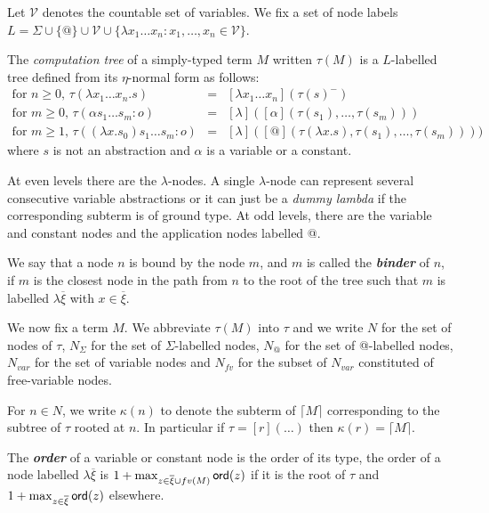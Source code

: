 \documentclass{llncs}
\newcommand\defname[1]{{\bf\em #1}\index{#1}}
\newcommand\aux[1]{\lceil #1\rceil}
\newcommand\ord[1]{{\sf ord}(#1)}
\newcommand\union{\cup}
\begin{document}
\begin{definition}
Let $\mathcal{V}$ denotes the countable set of variables. We fix a set of node labels
$ L = \Sigma \union \{ @ \} \union \mathcal{V} \union \{ \lambda x_1 \ldots x_n : x_1 ,\ldots, x_n \in \mathcal{V} \}$.


The \emph{computation tree} of a simply-typed term $M$ written $\tau(M)$ is
a $L$-labelled tree defined from its $\eta$-normal form as follows:
\begin{eqnarray*}
  \mbox{for $n\geq0$, } \tau(\lambda x_1 \ldots x_n . s) &=& [\lambda x_1 \ldots x_n](\tau(s)^{-}) \\
  \mbox{for $m\geq0$, } \tau( \alpha s_1 \ldots s_m : o) &=& [ \lambda ]([\alpha](\tau(s_1),\ldots,\tau(s_m)))\\
  \mbox{for $m \geq 1$, } \tau((\lambda x.s_0) s_1 \ldots s_m :o) &=& [\lambda] ([@](\tau(\lambda x.s),\tau(s_1),\ldots,\tau(s_m))) )
\end{eqnarray*}
where $s$ is not an abstraction and $\alpha$ is a variable or a constant.
\end{definition}

At even levels there are the $\lambda$-nodes. A single $\lambda$-node can represent several consecutive variable abstractions or it can just be
a \textsl{dummy lambda} if the corresponding subterm is of ground type.
At odd levels, there are the variable and constant nodes and the application nodes labelled @.

We say that a node $n$ is bound by the node $m$, and $m$ is called the
\defname{binder} of $n$, if $m$ is the closest node in the path from $n$ to
the root of the tree such that $m$ is labelled $\lambda
\overline{\xi}$ with $x\in \overline{\xi}$.


We now fix a term $M$. We abbreviate $\tau(M)$ into $\tau$ and we write
$N$ for the set of nodes of $\tau$, $N_\Sigma$ for the set of $\Sigma$-labelled nodes,
$N_@$ for the set of @-labelled nodes, $N_{var}$ for the set of variable nodes and
$N_{fv}$ for the subset of $N_{var}$ constituted of free-variable nodes.

For $n \in N$, we write $\kappa(n)$ to denote the subterm of $\aux{M}$
corresponding to the subtree of $\tau$ rooted at $n$.
In particular if $\tau = [r](\ldots)$ then $\kappa(r) = \aux{M}$.

The \defname{order} of a variable or constant node is the order of its type,
the order of a node labelled $\lambda \overline{\xi}$ is 
$1 +  \max_{z\in \overline{\xi}\union fv(M)} \ord{z}$ if it is the root of $\tau$ and $1 + \max_{z\in \overline{\xi}} \ord{z}$ elsewhere.
\end{document}
